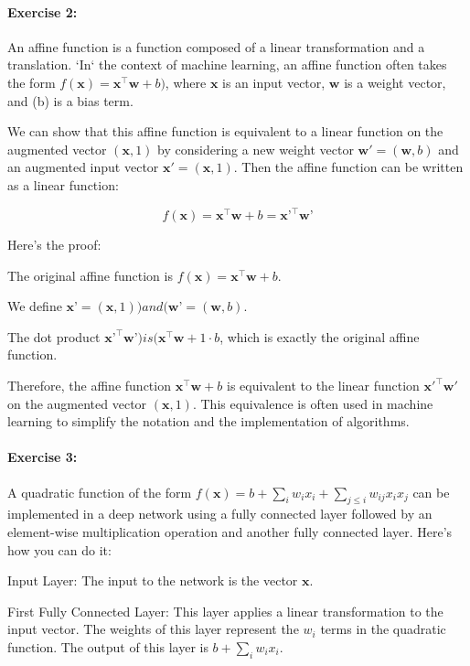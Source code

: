 \paragraph{Exercise 2:}

An affine function is a function composed of a linear transformation and a translation.
`In` the context of machine learning, an affine function often takes the form \(f(\mathbf{x}) = \mathbf{x}^\top \mathbf{w} + b)\), where \(\mathbf{x}\) is an input vector, \(\mathbf{w}\) is a weight vector, and (b) is a bias term.

We can show that this affine function is equivalent to a linear function on the augmented vector \((\mathbf{x}, 1)\) by considering a new weight vector \(\mathbf{w}' = (\mathbf{w}, b)\) and an augmented input vector \(\mathbf{x}' = (\mathbf{x}, 1)\). Then the affine function can be written as a linear function:

$$
	f(\mathbf{x}) = \mathbf{x}^\top \mathbf{w} + b = \mathbf{x}’^\top \mathbf{w}’
$$

Here’s the proof:

The original affine function is \(f(\mathbf{x}) = \mathbf{x}^\top \mathbf{w} + b\).

We define \(\mathbf{x}’ = (\mathbf{x}, 1)) and (\mathbf{w}’ = (\mathbf{w}, b)\).

The dot product \(\mathbf{x}’^\top \mathbf{w}’) is (\mathbf{x}^\top \mathbf{w} + 1 \cdot b\), which is exactly the original affine function.

Therefore, the affine function \(\mathbf{x}^\top \mathbf{w} + b\) is equivalent to the linear function \(\mathbf{x}'^\top \mathbf{w}'\) on the augmented vector \((\mathbf{x}, 1)\).
This equivalence is often used in machine learning to simplify the notation and the implementation of algorithms.

\paragraph{Exercise 3:}

A quadratic function of the form \(f(\mathbf{x}) = b + \sum_i w_i x_i + \sum_{j \leq i} w_{ij} x_{i} x_{j}\) can be implemented in a deep network using a fully connected layer followed by an element-wise multiplication operation and another fully connected layer.
Here’s how you can do it:

Input Layer: The input to the network is the vector \(\mathbf{x}\).

First Fully Connected Layer: This layer applies a linear transformation to the input vector.
The weights of this layer represent the \(w_i\) terms in the quadratic function. The output of this layer is \(b + \sum_i w_i x_i\).

